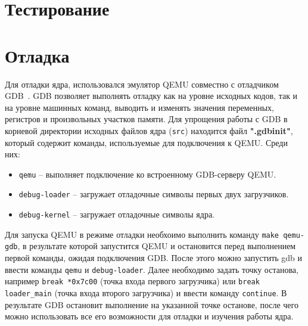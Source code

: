 \section{Тестирование}

\section{Отладка}
Для отладки ядра, использовался эмулятор QEMU совместно с отладчиком GDB~\cite{gdb}.
GDB позволяет выполнять отладку как на уровне исходных кодов, так и на уровне машинных команд,
выводить и изменять значения переменных, регистров и произвольных участков памяти. Для упрощения
работы с GDB в корневой директории исходных файлов ядра (\texttt{src}) находится файл \textbf{".gdbinit"},
который содержит команды, используемые для подключения к QEMU. Среди них:
\begin{itemize}
	\item \texttt{qemu} -- выполняет подключение ко встроенному GDB-серверу QEMU.
	\item \texttt{debug-loader} -- загружает отладочные символы первых двух загрузчиков.
	\item \texttt{debug-kernel} -- загружает отладочные символы ядра.
\end{itemize}

Для запуска QEMU в режиме отладки необхоимо выполнить команду \texttt{make qemu-gdb}, в результате
которой запустится QEMU и остановится перед выполнением первой команды, ожидая подключения GDB.
После этого можно запустить gdb и ввести команды \texttt{qemu} и \texttt{debug-loader}. Далее необходимо
задать точку останова, например \texttt{break *0x7c00} (точка входа первого загрузчика) или \texttt{break loader\_main}
(точка входа второго загрузчика) и ввести команду \texttt{continue}. В результате GDB остановит выполнение на
указанной точке останове, после чего можно использовать все его возможности для отладки и изучения работы ядра.


